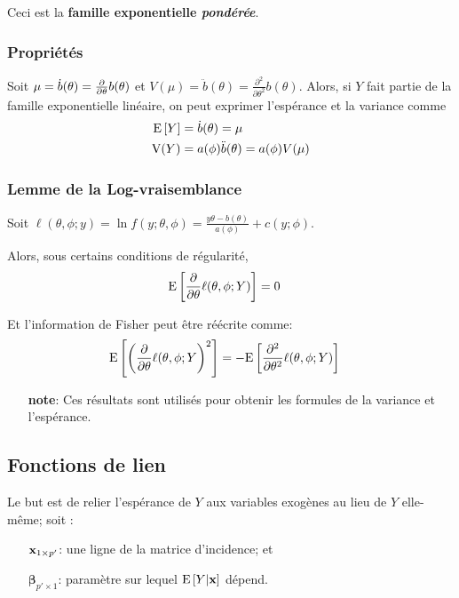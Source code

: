\documentclass[10pt, french]{article}
\begin{document}
\begin{multicols*}{3}
\begin{enumerate}[label=\faAngleRight]
		Ceci est la \textbf{famille exponentielle \textit{pondérée}}.
\end{enumerate}

\subsubsection*{Propriétés}

Soit $\mu = \dot{b}(\theta) = \frac{\partial}{\partial \theta} b(\theta)$ et $V(\mu) = \ddot{b}(\theta) = \frac{\partial^2}{\partial \theta^2} b(\theta)$. 
Alors, si $Y$ fait partie de la famille exponentielle linéaire, on peut exprimer l'espérance et la variance comme
\begin{align*}
\mathrm{E} \left[ Y \right]	
	&=	\dot{b}(\theta) 
	=	\mu 	\\
\text{V}(Y)	
	&=	a(\phi) \ddot{b}(\theta) 
	= 	a(\phi) V(\mu)	
\end{align*}

\subsubsection*{Lemme de la Log-vraisemblance}

Soit $\ell(\theta, \phi ; y) = \ln f(y ; \theta, \phi)  = \frac{y \theta - b(\theta)}{a(\phi)} + c(y ; \phi)$. 

Alors, sous certains conditions de régularité,
\begin{align*}
	\mathrm{E} \left[ \frac{\partial}{\partial \theta} \ell(\theta, \phi ; Y) \right] 
		&=	0 
\end{align*}

Et l'information de Fisher peut être réécrite comme:
\begin{align*}
	\mathrm{E} \left[ \left( \frac{\partial}{\partial \theta} \ell(\theta, \phi ; Y \right)^2 \right] 
		&=	-\mathrm{E} \left[ \frac{\partial^2}{\partial \theta^2} \ell(\theta, \phi ; Y) \right]
\end{align*}

\begin{enumerate}
	\item[\textbf{note}: ] Ces résultats sont utilisés pour obtenir les formules de la variance et l'espérance.

\end{enumerate}

\subsection*{Fonctions de lien}

Le but est de relier l'espérance de $Y$ aux variables exogènes au lieu de $Y$ elle-même; soit :
\begin{enumerate}
	\item[$\mathbf{x}_{1 \times p'}$: ] une ligne de la matrice d'incidence; et
	\item[$\bm{\beta}_{p' \times 1}$: ] paramètre sur lequel $\mathrm{E} \left[ Y | \mathbf{x} \right]$ dépend.
\end{enumerate}


\end{multicols*}
\end{document}
